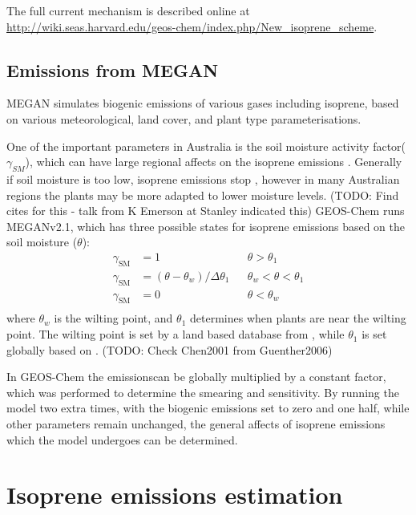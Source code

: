     The full current mechanism is described online at \url{http://wiki.seas.harvard.edu/geos-chem/index.php/New_isoprene_scheme}.
    
  \subsection{Emissions from MEGAN}
    MEGAN simulates biogenic emissions of various gases including isoprene, based on various meteorological, land cover, and plant type parameterisations.
    
    One of the important parameters in Australia is the soil moisture activity factor($\gamma_{SM}$), which can have large regional affects on the isoprene emissions \citep{Sindelarova2014,Bauwens2016}.
    Generally if soil moisture is too low, isoprene emissions stop \citep{Pegoraro2004,Niinemets2010}, however in many Australian regions the plants may be more adapted to lower moisture levels. (TODO: Find cites for this - talk from K Emerson at Stanley indicated this)
    GEOS-Chem runs MEGANv2.1, which has three possible states for isoprene emissions based on the soil moisture ($\theta$):
    \begin{align*}
      \gamma_\mathrm{SM} & = 1 && \theta > \theta_1 \\
      \gamma_\mathrm{SM} & = (\theta-\theta_w)/\Delta\theta_1  && \theta_w < \theta < \theta_1 \\
      \gamma_\mathrm{SM} & = 0 && \theta < \theta_w \\
    \end{align*}
    where $\theta_w$ is the wilting point, and $\theta_1$ determines when plants are near the wilting point.
    The wilting point is set by a land based database from \citet{Chen2001}, while $\theta_1$ is set globally based on \citet{Pegoraro2004}. (TODO: Check Chen2001 from Guenther2006)
    
    In GEOS-Chem the emissionscan be globally multiplied by a constant factor, which was performed to determine the smearing and sensitivity.
    By running the model two extra times, with the biogenic emissions set to zero and one half, while other parameters remain unchanged, the general affects of isoprene emissions which the model undergoes can be determined.
    
\section{Isoprene emissions estimation}
\label{ch_isop:sec:IsopreneEmissions}

